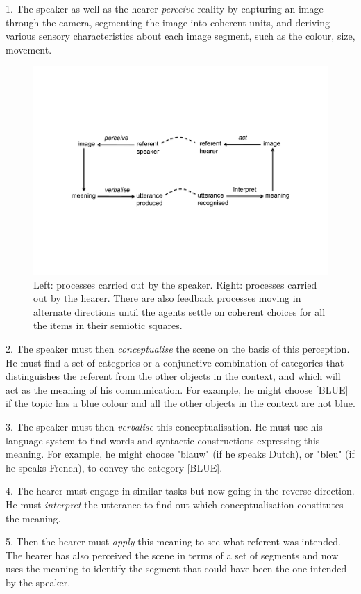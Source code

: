 1. The speaker as well as the hearer {\it perceive} reality
by capturing an image through the camera, segmenting 
the image into coherent units, and deriving various 
sensory characteristics about each image segment, 
such as the colour, size, movement. 
\begin{figure}[htbp]
  \centerline{\includegraphics[width=.85\textwidth]{chap2/figs/triangle2}}
\caption{\small\label{triangle2a} Left: processes carried
out by the speaker. Right: processes carried out by the hearer.
There are also feedback processes moving in alternate directions
until the agents settle on coherent choices for all the items
in their semiotic squares.}
\end{figure}

2. The speaker must then {\it conceptualise} the 
scene on the basis of this perception. He must find a set of
categories or a conjunctive combination of 
categories that distinguishes the referent from the other objects in 
the context, and which will act as the meaning of 
his communication. For example, he might choose [BLUE] if the
topic has a blue colour and all the other objects in the 
context are not blue. 

3. The speaker must then {\it verbalise} this conceptualisation. 
He must use his language system to find words and 
syntactic constructions expressing this meaning.
For example, he might choose "blauw" (if he speaks
Dutch), or "bleu" (if he speaks French),
to convey the category [BLUE]. 

4. The hearer must engage in similar tasks but now
going in the reverse direction. He must
{\it interpret} the utterance to find out which
conceptualisation constitutes the meaning. 

5. Then the hearer must {\it apply} this meaning
to see what referent was intended. The hearer has
also perceived the scene in terms of a set of 
segments and now uses 
the meaning to identify the segment that
could have been the one intended by the speaker.


